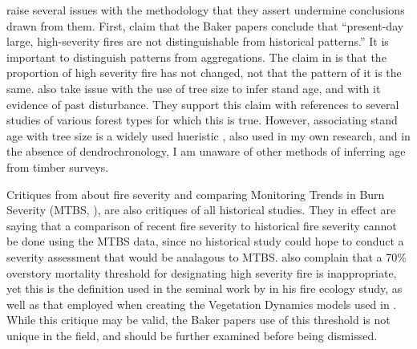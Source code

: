 \citet{Fule2014} raise several issues with the \citet{Baker2014} methodology that they assert undermine conclusions drawn from them. First, \citet{Fule2014} claim that the Baker papers \citep{Baker2012,Baker2014} conclude that ``present-day large, high-severity fires are not distinguishable from historical patterns.'' It is important to distinguish patterns from aggregations. The claim in \citet{Baker2012} is that the proportion of high severity fire has not changed, not that the pattern of it is the same. \citet{Fule2014} also take issue with the use of tree size to infer stand age, and with it evidence of past disturbance. They support this claim with references to several studies of various forest types for which this is true. However, associating stand age with tree size is a widely used hueristic \citep{WHR1988,Landfire2007,USDAForestService2009}, also used in my own research, and in the absence of dendrochronology, I am unaware of other methods of inferring age from timber surveys.

Critiques from \citet{Fule2014} about fire severity and comparing Monitoring Trends in Burn Severity (MTBS, ), are also critiques of all historical studies. They in effect are saying that a comparison of recent fire severity to historical fire severity cannot be done using the MTBS data, since no historical study could hope to conduct a severity assessment that would be analagous to MTBS. \citet{Fule2014} also complain that a 70\% overstory mortality threshold for designating high severity fire is inappropriate, yet this is the definition used in the seminal work by \citet{Agee1993} in his fire ecology study, as well as that employed when creating the Vegetation Dynamics models used in \citet{Landfire2007}. While this critique may be valid, the Baker papers use of this threshold is not unique in the field, and should be further examined before being dismissed. 

